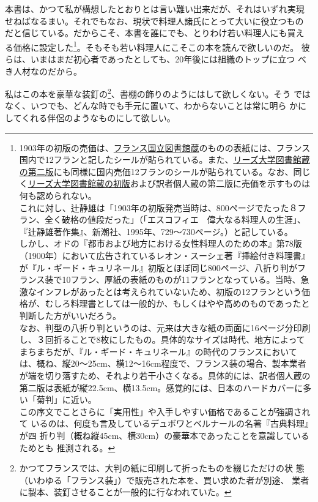 \documentclass[twoside,12Q,b5paper,tombo]{ltjsbook}
\begin{document}
本書は、かつて私が構想したとおりとは言い難い出来だが、それはいずれ実現
せねばなるまい。それでもなお、現状で料理人諸氏にとって大いに役立つもの
だと信じている。だからこそ、本書を誰にでも、とりわけ若い料理人にも買え
る価格に設定した\footnote{1903年の初版の売価は、\href{http://gallica.bnf.fr/ark:/12148/bpt6k65768837}{フランス国立図書館蔵}のものの表紙には、フランス国内で12フランと記したシールが貼られている。また、\href{https://archive.org/details/b21525912}{リーズ大学図書館蔵の第二版}にも同様に国内売価12フランのシールが貼られている。なお、同じく\href{https://archive.org/details/b21525730}{リーズ大学図書館蔵の初版}および訳者個人蔵の第二版に売価を示すものは何も認められない。\\
  これに対し、辻静雄は「1903年の初版発売当時は、800ページでたった８フラン、全く破格の値段だった」（「エスコフィエ　偉大なる料理人の生涯」、『辻静雄著作集』、新潮社、1995年、729〜730ページ。）と記している。\\
  しかし、オドの『都市および地方における女性料理人のための本』第78版（1900年）において広告されているレオン・スーシェ著『挿絵付き料理書』が『ル・ギード・キュリネール』初版とほぼ同じ800ページ、八折り判がフランス装で10フラン、厚紙の表紙のものが11フランとなっている。当時、急激なインフレがあったとは考えられていないため、初版の12フランという価格が、むしろ料理書としては一般的か、もしくはやや高めのものであったと判断した方がいいだろう。\\
  なお、判型の八折り判というのは、元来は大きな紙の両面に16ページ分印刷し、３回折ることで8枚にしたもの。具体的なサイズは時代、地方によってまちまちだが、『ル・ギード・キュリネール』の時代のフランスにおいては、概ね、縦20〜25cm、横12〜16cm程度で、フランス装の場合、製本業者が端を切り落すため、それより若干小さくなる。具体的には、訳者個人蔵の第二版は表紙が縦22.5cm、横13.5cm。感覚的には、日本のハードカバーに多い「菊判」に近い。\\
  この序文でことさらに「実用性」や入手しやすい価格であることが強調されて
  いるのは、何度も言及しているデュボワとベルナールの名著『古典料理』が四
  折り判（概ね縦45cm、横30cm）の豪華本であったことを意識しているためとも
  推測される。}。そもそも若い料理人にこそこの本を読んで欲しいのだ。
彼らは、いまはまだ初心者であったとしても、20年後には組織のトップに立つ
べき人材なのだから。

私はこの本を豪華な装釘の\footnote{かつてフランスでは、大判の紙に印刷して折ったものを綴じただけの状
  態（いわゆる「フランス装」）で販売された本を、買い求めた者が別途、
  業者に製本、装釘させることが一般的に行なわれていた。}、書棚の飾りのようにはして欲しくない。そう
ではなく、いつでも、どんな時でも手元に置いて、わからないことは常に明ら
かにしてくれる伴侶のようなものにして欲しい。
\end{document}
